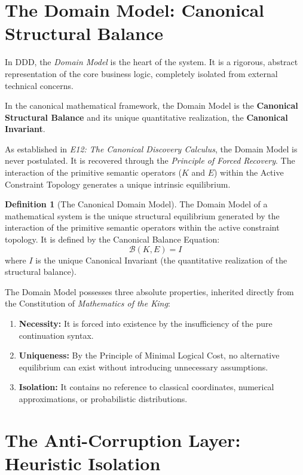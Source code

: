 \documentclass[12pt,openany]{extbook}
\theoremstyle{plain}
\theoremstyle{definition}
\newtheorem{definition}{Definition}[chapter]
\begin{document}
\section{The Domain Model: Canonical Structural Balance}

In DDD, the \emph{Domain Model} is the heart of the system. It is a rigorous, abstract representation of the core business logic, completely isolated from external technical concerns.

In the canonical mathematical framework, the Domain Model is the \textbf{Canonical Structural Balance} and its unique quantitative realization, the \textbf{Canonical Invariant}. 

As established in \emph{E12: The Canonical Discovery Calculus}, the Domain Model is never postulated. It is recovered through the \emph{Principle of Forced Recovery}. The interaction of the primitive semantic operators ($K$ and $E$) within the Active Constraint Topology generates a unique intrinsic equilibrium. 

\begin{definition}[The Canonical Domain Model]
The Domain Model of a mathematical system is the unique structural equilibrium generated by the interaction of the primitive semantic operators within the active constraint topology. It is defined by the Canonical Balance Equation:
\[
\mathcal{B}(K, E) = I
\]
where $I$ is the unique Canonical Invariant (the quantitative realization of the structural balance).
\end{definition}

The Domain Model possesses three absolute properties, inherited directly from the Constitution of \emph{Mathematics of the King}:
\begin{enumerate}
    \item \textbf{Necessity:} It is forced into existence by the insufficiency of the pure continuation syntax.
    \item \textbf{Uniqueness:} By the Principle of Minimal Logical Cost, no alternative equilibrium can exist without introducing unnecessary assumptions.
    \item \textbf{Isolation:} It contains no reference to classical coordinates, numerical approximations, or probabilistic distributions.
\end{enumerate}

\section{The Anti-Corruption Layer: Heuristic Isolation}
\end{document}

